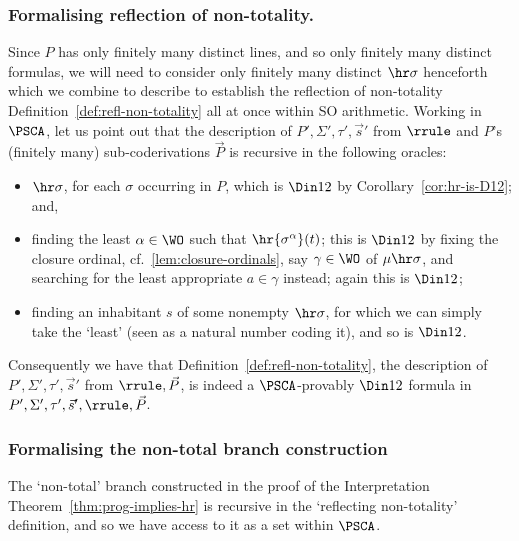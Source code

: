\subsubsection*{Formalising reflection of non-totality.} 

Since $P$ has only finitely many distinct lines, and so only finitely many distinct formulas, we will need to consider only finitely many distinct $\hr\sigma$ henceforth which we combine to describe to establish the reflection of non-totality Definition~\ref{def:refl-non-totality} all at once within SO arithmetic.
Working in $\PSCA$, let us point out that the description of $P', \Sigma', \tau',\vec s'$ from $\rrule$ and $P$'s (finitely many) sub-coderivations $\vec P$ is recursive in the following oracles:
\begin{itemize}
    \item $\hr\sigma$, for each $\sigma $ occurring in $P$, which is $\Din 1 2 $ by Corollary~\ref{cor:hr-is-D12}; and,
    \item finding the least $\alpha \in \WO$ such that $ \hr{\sigma^\alpha}(t)$; this is $\Din 1 2 $ by fixing the closure ordinal, cf.~\ref{lem:closure-ordinals}, say $\gamma \in \WO$ of $\mu \hr\sigma$, and searching for the least appropriate $a\in \gamma$ instead; again this is $\Din 1 2$;
    \item finding an inhabitant $s$ of some nonempty $\hr\sigma$, for which we can simply take the `least' (seen as a natural number coding it), and so is $\Din 1 2$.
\end{itemize}

Consequently we have that Definition~\ref{def:refl-non-totality}, the description of $P', \Sigma', \tau',\vec s'$ from $\rrule, \vec P$, is indeed a $\PSCA$-provably $\Din 1 2$ formula in $P', \Sigma', \tau',\vec s',\rrule, \vec P$.


\subsubsection*{Formalising the non-total branch construction}

The `non-total' branch constructed in the proof of the Interpretation Theorem~\ref{thm:prog-implies-hr} is recursive in the `reflecting non-totality' definition, and so we have access to it as a set within $\PSCA$.


